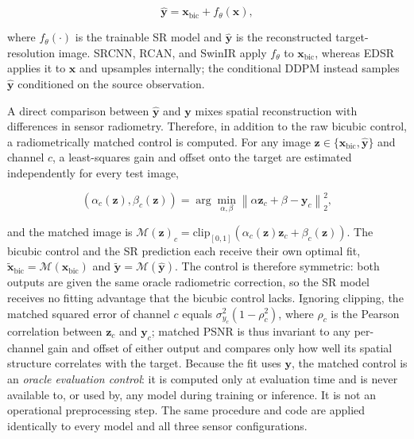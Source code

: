 \documentclass[conference]{IEEEtran}
\begin{document}
\begin{equation}
\hat{\mathbf{y}}
=
\mathbf{x}_{\mathrm{bic}}
+
f_{\theta}(\mathbf{x}),
\label{eq:sr_prediction}
\end{equation}

where $f_{\theta}(\cdot)$ is the trainable SR model and
$\hat{\mathbf{y}}$ is the reconstructed target-resolution image.
SRCNN, RCAN, and SwinIR apply $f_{\theta}$ to $\mathbf{x}_{\mathrm{bic}}$,
whereas EDSR applies it to $\mathbf{x}$ and upsamples internally; the
conditional DDPM instead samples $\hat{\mathbf{y}}$ conditioned on the
source observation.

A direct comparison between $\hat{\mathbf{y}}$ and $\mathbf{y}$ mixes
spatial reconstruction with differences in sensor radiometry.
Therefore, in addition to the raw bicubic control, a radiometrically
matched control is computed. For any image
$\mathbf{z}\in\{\mathbf{x}_{\mathrm{bic}},\hat{\mathbf{y}}\}$ and
channel $c$, a least-squares gain and offset onto the target are
estimated independently for every test image,

\begin{equation}
(\alpha_c(\mathbf{z}),\beta_c(\mathbf{z}))
=
\arg\min_{\alpha,\beta}
\left\|
\alpha \mathbf{z}_{c}
+\beta-\mathbf{y}_{c}
\right\|_2^2 ,
\label{eq:affine}
\end{equation}

and the matched image is
$\mathcal{M}(\mathbf{z})_c=\mathrm{clip}_{[0,1]}
(\alpha_c(\mathbf{z})\mathbf{z}_c+\beta_c(\mathbf{z}))$.
The bicubic control and the SR prediction each receive their own
optimal fit, $\tilde{\mathbf{x}}_{\mathrm{bic}}=
\mathcal{M}(\mathbf{x}_{\mathrm{bic}})$ and
$\tilde{\mathbf{y}}=\mathcal{M}(\hat{\mathbf{y}})$.
The control is therefore symmetric: both outputs are given the same
oracle radiometric correction, so the SR model receives no fitting
advantage that the bicubic control lacks. Ignoring clipping, the
matched squared error of channel $c$ equals
$\sigma_{y_c}^2(1-\rho_c^2)$, where $\rho_c$ is the Pearson
correlation between $\mathbf{z}_c$ and $\mathbf{y}_c$; matched PSNR
is thus invariant to any per-channel gain and offset of either output
and compares only how well its spatial structure correlates with the
target. Because the fit uses $\mathbf{y}$, the matched control is an
\emph{oracle evaluation control}: it is computed only at evaluation
time and is never available to, or used by, any model during training
or inference. It is not an operational preprocessing step. The same
procedure and code are applied identically to every model and all
three sensor configurations.
\end{document}
